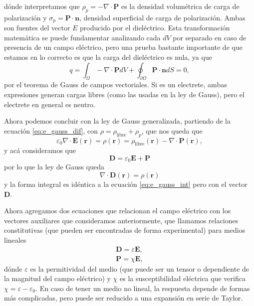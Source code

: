 \documentclass[11pt,a4paper]{article}
\numberwithin{equation}{section}
\begin{document}
dónde interpretamos que $\rho_p = - \nabla \cdot \textbf{P}$ es la densidad volumétrica de carga de polarización y $\sigma_p = \textbf{P} \cdot \textbf{n}$, densidad superficial de carga de polarización. Ambas son fuentes del vector $E$ producido por el dieléctrico. Esta transformación matemática se puede fundamentar analizando cada $dV$ por separado en caso de presencia de un campo eléctrico, pero una prueba bastante importante de que estamos en lo correcto es que la carga del dieléctrico es nula, ya que \[q = \int_{\Omega} - \nabla \cdot \textbf{P} dV + \oint_{\partial \Omega} \textbf{P} \cdot \textbf{n} dS = 0,\] por el teorema de Gauss de campos vectoriales. Si es un electrete, ambas expresiones generan cargas libres (como las usadas en la ley de Gauss), pero el electrete en general es neutro.

Ahora podemos concluir con la ley de Gauss generalizada, partiendo de la ecuación \ref{eq:e_gauss_dif}, con $\rho = \rho_{\text{libre}} + \rho_p$, que nos queda que \[\varepsilon_0 \nabla \cdot \textbf{E}(\textbf{r}) = \rho(\textbf{r}) = \rho_{\text{libre}}(\textbf{r}) - \nabla \cdot \textbf{P}(\textbf{r}),\] y acá consideramos que 
\begin{equation}
    \textbf{D} = \varepsilon_0\textbf{E} + \textbf{P}
    \label{eq:e_desplazamiento}
\end{equation}
por lo que la ley de Gauss queda
\begin{equation}
    \nabla \cdot \textbf{D}(\textbf{r}) = \rho(\textbf{r})
    \label{eq:e_gauss_dif_dielectricos}
\end{equation}
y la forma integral es idéntica a la ecuación \ref{eq:e_gauss_int} pero con el vector $\textbf{D}$.

Ahora agregamos dos ecuaciones que relacionan el campo eléctrico con los vectores auxiliares que consideramos anteriormente, que llamamos relaciones constitutivas (que pueden ser encontradas de forma experimental) para medios lineales
    \begin{align}
        \textbf{D} = \varepsilon \textbf{E}, \\
        \textbf{P} = \chi \textbf{E},
        \label{eq:e_relaciones_constitutivas}
    \end{align}
    dónde $\varepsilon$ es la permitividad del medio (que puede ser un tensor o dependiente de la magnitud del campo eléctrico) y $\chi$ es la susceptibilidad eléctrica que verifica $\chi = \varepsilon - \varepsilon_0$. En caso de tener un medio no lineal, la respuesta depende de formas más complicadas, pero puede ser reducido a una expansión en serie de Taylor.
\end{document}
